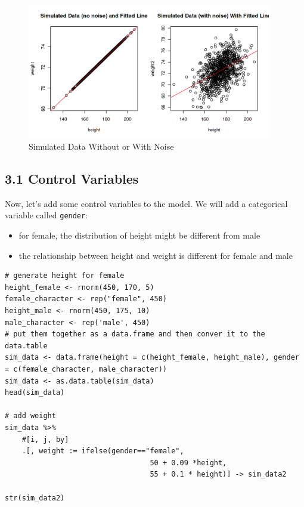 \documentclass[11pt]{article}
\theoremstyle{definition}
\providecommand{\tightlist}{%
\setlength{\itemsep}{0pt}\setlength{\parskip}{0pt}}
\begin{document}
\begin{figure}[!htbp]
  \centering
  \includegraphics[width=0.95\textwidth]{./figures/reg_figure1.png}
  \caption{Simulated Data Without or With Noise}
\end{figure}


\subsection{3.1 Control Variables}

Now, let's add some control variables to the model. We will add a categorical
variable called \texttt{gender}:

\begin{itemize}
  \tightlist
  \item for female, the distribution of height might be different from male
  \item the relationship between height and weight is different for female and male
\end{itemize}


\begin{lstlisting}
# generate height for female
height_female <- rnorm(450, 170, 5)
female_character <- rep("female", 450)
height_male <- rnorm(450, 175, 10)
male_character <- rep('male', 450)
# put them together as a data.frame and then conver it to the data.table
sim_data <- data.frame(height = c(height_female, height_male), gender = c(female_character, male_character))
sim_data <- as.data.table(sim_data)
head(sim_data)

# add weight 
sim_data %>%
    #[i, j, by]
    .[, weight := ifelse(gender=="female",
                                  50 + 0.09 *height,
                                  55 + 0.1 * height)] -> sim_data2

str(sim_data2)
\end{lstlisting}
\end{document}
